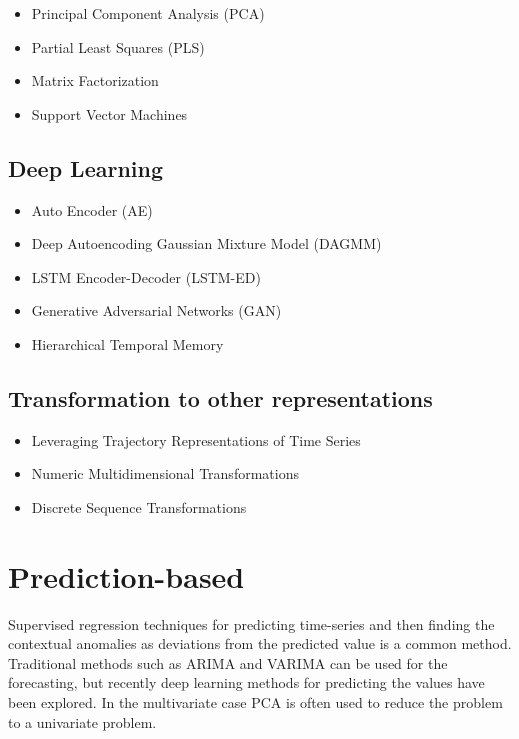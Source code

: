 \begin{itemize}
    \item Principal Component Analysis (PCA) \cite{Li2019a}
    \item Partial Least Squares (PLS) \cite{Li2019a}
    \item Matrix Factorization \cite{Aggarwal2013a}
    \item Support Vector Machines \cite{Aggarwal2013a}
\end{itemize}

\subsection{Deep Learning}

\begin{itemize}
    \item Auto Encoder (AE) \cite{Li2019a}
    \item Deep Autoencoding Gaussian Mixture Model (DAGMM) \cite{Li2019a}
    \item LSTM Encoder-Decoder (LSTM-ED) \cite{Li2019a}
    \item Generative Adversarial Networks (GAN) \cite{Li2019a}
    \item Hierarchical Temporal Memory
\end{itemize}

\subsection{Transformation to other representations}

\begin{itemize}
    \item Leveraging Trajectory Representations of Time Series \cite{Aggarwal2013a}
    \item Numeric Multidimensional Transformations \cite{Aggarwal2013a}
    \item Discrete Sequence Transformations \cite{Aggarwal2013a}
\end{itemize}

\newpage



\section{Prediction-based}

Supervised regression techniques for predicting time-series and then finding the contextual anomalies as deviations from the predicted value is a common method. Traditional methods such as ARIMA and VARIMA can be used for the forecasting, but recently deep learning methods for predicting the values have been explored. In the multivariate case PCA is often used to reduce the problem to a univariate problem.

